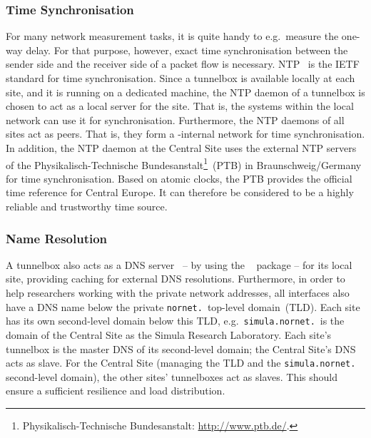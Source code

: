 \subsubsection{Time Synchronisation}

For many network measurement tasks, it is quite handy to e.g.\ measure the one-way delay. For that purpose, however, exact time synchronisation between the sender side and the receiver side of a packet flow is necessary. NTP~\cite{RFC5905} is the IETF standard for time synchronisation. Since a tunnelbox is available locally at each site, and it is running on a dedicated machine, the NTP daemon of a tunnelbox is chosen to act as a local server for the site. That is, the systems within the local network can use it for synchronisation. Furthermore, the NTP daemons of all sites act as peers. That is, they form a -internal network for time synchronisation. In addition, the NTP daemon at the Central Site uses the external NTP servers of the Physikalisch-Technische Bundesanstalt\footnote{Physikalisch-Technische Bundesanstalt: \url{http://www.ptb.de/}.}~(PTB) in Braunschweig/Germany for time synchronisation. Based on atomic clocks, the PTB provides the official time reference for Central Europe. It can therefore be considered to be a highly reliable and trustworthy time source.

\subsubsection{Name Resolution}
\label{subsub:Tunnelbox-Name-Resolution}

A tunnelbox also acts as a DNS server~\cite{RFC1035} -- by using the ~\cite{Bind9ARM} package -- for its local site, providing caching for external DNS resolutions. Furthermore, in order to help researchers working with the  private network addresses, all interfaces also have a DNS name below the private \texttt{nornet.}\ top-level domain~(TLD). Each site has its own second-level domain below this TLD, e.g.\ \texttt{simula.nornet.}\ is the domain of the Central Site as the Simula Research Laboratory. Each site's tunnelbox is the master DNS of its second-level domain; the Central Site's DNS acts as slave. For the Central Site (managing the TLD and the \texttt{simula.nornet.} second-level domain), the other sites' tunnelboxes act as slaves. This should ensure a sufficient resilience and load distribution.

